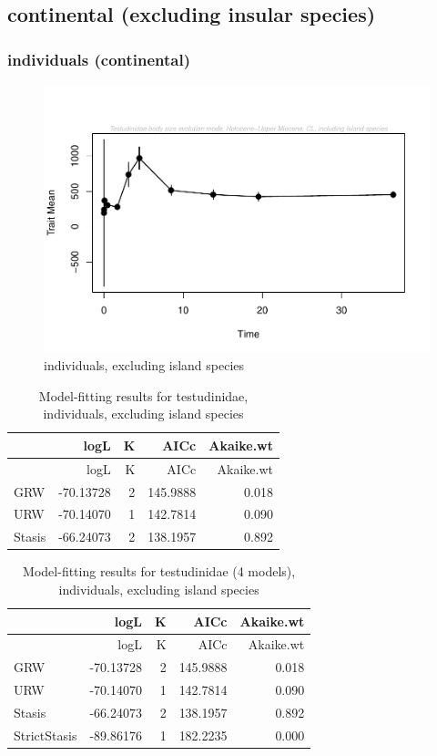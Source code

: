 \documentclass[]{article}
\begin{document}
\newpage

\subsection{continental (excluding insular
species)}\label{continental-excluding-insular-species}

\subsubsection{individuals (continental)}\label{individuals-continental}

\begin{figure}[htbp]
\centering
\includegraphics{MA_JJ_files/figure-latex/paleoTS, individuals, exluding island species-1.pdf}
\caption{individuals, excluding island species}
\end{figure}

\begin{longtable}[]{@{}lrrrr@{}}
\caption{Model-fitting results for testudinidae, individuals, excluding
island species}\tabularnewline
\toprule
& logL & K & AICc & Akaike.wt\tabularnewline
\midrule
\endfirsthead
\toprule
& logL & K & AICc & Akaike.wt\tabularnewline
\midrule
\endhead
GRW & -70.13728 & 2 & 145.9888 & 0.018\tabularnewline
URW & -70.14070 & 1 & 142.7814 & 0.090\tabularnewline
Stasis & -66.24073 & 2 & 138.1957 & 0.892\tabularnewline
\bottomrule
\end{longtable}

\begin{longtable}[]{@{}lrrrr@{}}
\caption{Model-fitting results for testudinidae (4 models), individuals,
excluding island species}\tabularnewline
\toprule
& logL & K & AICc & Akaike.wt\tabularnewline
\midrule
\endfirsthead
\toprule
& logL & K & AICc & Akaike.wt\tabularnewline
\midrule
\endhead
GRW & -70.13728 & 2 & 145.9888 & 0.018\tabularnewline
URW & -70.14070 & 1 & 142.7814 & 0.090\tabularnewline
Stasis & -66.24073 & 2 & 138.1957 & 0.892\tabularnewline
StrictStasis & -89.86176 & 1 & 182.2235 & 0.000\tabularnewline
\bottomrule
\end{longtable}
\end{document}
